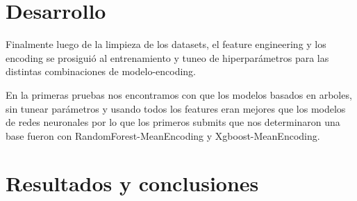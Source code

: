 \documentclass[12pt,a4paper]{article}
\begin{document}
\section{Desarrollo}

Finalmente luego de la limpieza de los datasets, el feature engineering y los encoding se prosiguió al entrenamiento y tuneo de hiperparámetros para las distintas combinaciones de modelo-encoding.

En la primeras pruebas nos encontramos con que los modelos basados en arboles, sin tunear parámetros y usando todos los features eran mejores que los modelos de redes neuronales por lo que los primeros submits que nos determinaron una base fueron con
RandomForest-MeanEncoding y Xgboost-MeanEncoding.




\section{Resultados y conclusiones}
\end{document}
